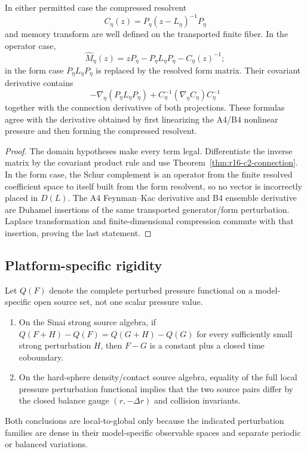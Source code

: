 \begin{theorem}
\label{thm:r16-c2-memory}
In either permitted case the compressed resolvent
\[
 C_\eta(z)=P_\eta(z-L_\eta)^{-1}P_\eta
\]
and memory transform are well defined on the transported finite fiber.  In
the operator case,
\[
 \widehat M_\eta(z)=zP_\eta-P_\eta L_\eta P_\eta-C_\eta(z)^{-1};
\]
in the form case \(P_\eta L_\eta P_\eta\) is replaced by the
resolved form matrix.  Their covariant derivative contains
\[
 -\nabla_\eta(P_\eta L_\eta P_\eta)
 +C_\eta^{-1}(\nabla_\eta C_\eta)C_\eta^{-1}
\]
together with the connection derivatives of both projections.  These formulas
agree with the derivative obtained by first linearizing the A4/B4 nonlinear
pressure and then forming the compressed resolvent.
\end{theorem}

\begin{proof}
The domain hypotheses make every term legal.  Differentiate the inverse matrix
by the covariant product rule and use
Theorem~\ref{thm:r16-c2-connection}.  In the form case, the Schur complement is
an operator from the finite resolved coefficient space to itself built from
the form resolvent, so no vector is incorrectly placed in \(D(L)\).  The A4
Feynman--Kac derivative and B4 ensemble derivative are Duhamel insertions of
the same transported generator/form perturbation.  Laplace transformation and
finite-dimensional compression commute with that insertion, proving the last
statement.
\end{proof}

\subsection{Platform-specific rigidity}

Let \(Q(F)\) denote the complete perturbed pressure functional on a
model-specific open source set, not one scalar pressure value.

\begin{theorem}
\label{thm:r16-c2-rigidity}
\begin{enumerate}[label=(\roman*)]
\item On the Sinai strong source algebra, if
\(Q(F+H)-Q(F)=Q(G+H)-Q(G)\) for every sufficiently small strong perturbation
\(H\), then \(F-G\) is a constant plus a closed time coboundary.
\item On the hard-sphere density/contact source algebra, equality of the full
local pressure perturbation functional implies that the two source pairs
differ by the closed balance gauge \((r,-\Delta r)\) and collision invariants.
\end{enumerate}
Both conclusions are local-to-global only because the indicated perturbation
families are dense in their model-specific observable spaces and separate
periodic or balanced variations.
\end{theorem}

